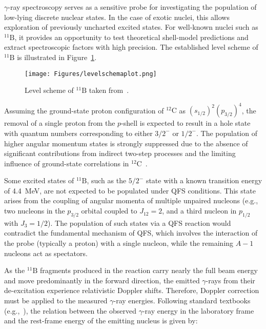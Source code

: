 $\gamma$-ray spectroscopy serves as a sensitive probe for investigating the population of low-lying discrete nuclear states. In the case of exotic nuclei, this allows exploration of previously uncharted excited states. For well-known nuclei such as $^{11}\mathrm{B}$, it provides an opportunity to test theoretical shell-model predictions and extract spectroscopic factors with high precision. The established level scheme of $^{11}\mathrm{B}$ is illustrated in Figure~\ref{fig:11B_levels}.
\begin{figure}[htpb]
    \centering
    \texttt{[image: Figures/levelschemaplot.png]}
    \caption{
Level scheme of $^{11}\mathrm{B}$ taken from~\cite{iaea_nuclide_chart}.
    }
    \label{fig:11B_levels}
\end{figure}

Assuming the ground-state proton configuration of $^{12}\mathrm{C}$ as $(s_{1/2})^2(p_{3/2})^4$, the removal of a single proton from the $p$-shell is expected to result in a hole state with quantum numbers corresponding to either $3/2^-$ or $1/2^-$. The population of higher angular momentum states is strongly suppressed due to the absence of significant contributions from indirect two-step processes and the limiting influence of ground-state correlations in $^{12}\mathrm{C}$~\cite{van1988weak}.

Some excited states of $^{11}\mathrm{B}$, such as the $5/2^-$ state with a known transition energy of 4.4~MeV, are not expected to be populated under QFS conditions. This state arises from the coupling of angular momenta of multiple unpaired nucleons (e.g., two nucleons in the $p_{3/2}$ orbital coupled to $J_{12} = 2$, and a third nucleon in $p_{1/2}$ with $J_3 = 1/2$). The population of such states via a QFS reaction would contradict the fundamental mechanism of QFS, which involves the interaction of the probe (typically a proton) with a single nucleon, while the remaining $A-1$ nucleons act as spectators.

As the $^{11}\mathrm{B}$ fragments produced in the reaction carry nearly the full beam energy and move predominantly in the forward direction, the emitted $\gamma$-rays from their de-excitation experience relativistic Doppler shifts. Therefore, Doppler correction must be applied to the measured $\gamma$-ray energies. Following standard textbooks (e.g.,~\cite{krane1987}), the relation between the observed $\gamma$-ray energy in the laboratory frame and the rest-frame energy of the emitting nucleus is given by:

